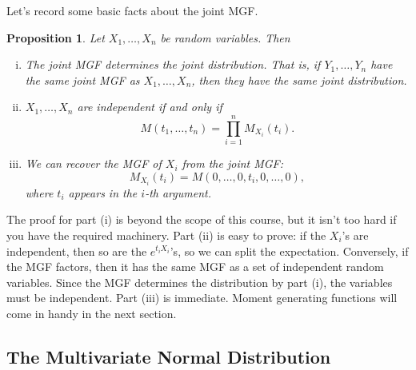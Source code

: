 \documentclass[12pt]{article}
\theoremstyle{plain}
\newtheorem{proposition}[theorem]{Proposition}
\theoremstyle{definition}
\theoremstyle{remark}
\begin{document}
Let's record some basic facts about the joint MGF.
\begin{proposition}
    Let $X_1, \ldots, X_n$ be random variables. Then
    \begin{enumerate}[(i)]
        \item The joint MGF determines the joint distribution.
        That is, if $Y_1, \ldots, Y_n$ have the same joint MGF as $X_1, \ldots, X_n$, then they have the same joint distribution.

        \item $X_1, \ldots, X_n$ are independent if and only if
        \[
            M(t_1, \ldots, t_n)  = \prod_{i=1}^nM_{X_i}(t_i).
        \]

        \item We can recover the MGF of $X_i$ from the joint MGF:
        \[
            M_{X_i}(t_i) = M(0, \ldots, 0, t_i, 0, \ldots, 0),
        \]
        where $t_i$ appears in the $i$-th argument.
    \end{enumerate}
\end{proposition}

The proof for part (i) is beyond the scope of this course, but it isn't too hard if you have the required machinery.
Part (ii) is easy to prove: if the $X_i$'s are independent, then so are the $e^{t_iX_i}$'s, so we can split the expectation.
Conversely, if the MGF factors, then it has the same MGF as a set of independent random variables.
Since the MGF determines the distribution by part (i), the variables must be independent.
Part (iii) is immediate.
Moment generating functions will come in handy in the next section.









\subsection{The Multivariate Normal Distribution}
\end{document}
